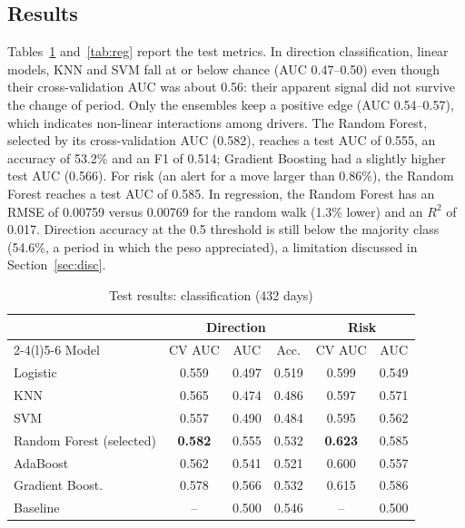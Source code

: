 \documentclass[conference]{IEEEtran}
\begin{document}
\subsection{Results}
Tables~\ref{tab:clf} and~\ref{tab:reg} report the test metrics. In direction classification, linear models, KNN and SVM fall at or below chance (AUC 0.47--0.50) even though their cross-validation AUC was about 0.56: their apparent signal did not survive the change of period. Only the ensembles keep a positive edge (AUC 0.54--0.57), which indicates non-linear interactions among drivers. The Random Forest, selected by its cross-validation AUC (0.582), reaches a test AUC of 0.555, an accuracy of 53.2\% and an F1 of 0.514; Gradient Boosting had a slightly higher test AUC (0.566). For risk (an alert for a move larger than 0.86\%), the Random Forest reaches a test AUC of 0.585. In regression, the Random Forest has an RMSE of 0.00759 versus 0.00769 for the random walk (1.3\% lower) and an $R^2$ of 0.017. Direction accuracy at the 0.5 threshold is still below the majority class (54.6\%, a period in which the peso appreciated), a limitation discussed in Section~\ref{sec:disc}.

\begin{table}[t]
\caption{Test results: classification (432 days)}
\label{tab:clf}
\centering
\footnotesize
\begin{tabular}{@{}lccccc@{}}
\toprule
 & \multicolumn{3}{c}{Direction} & \multicolumn{2}{c}{Risk} \\
\cmidrule(lr){2-4}\cmidrule(l){5-6}
Model & CV AUC & AUC & Acc. & CV AUC & AUC \\
\midrule
Logistic & 0.559 & 0.497 & 0.519 & 0.599 & 0.549 \\
KNN & 0.565 & 0.474 & 0.486 & 0.597 & 0.571 \\
SVM & 0.557 & 0.490 & 0.484 & 0.595 & 0.562 \\
Random Forest (selected) & \textbf{0.582} & 0.555 & 0.532 & \textbf{0.623} & 0.585 \\
AdaBoost & 0.562 & 0.541 & 0.521 & 0.600 & 0.557 \\
Gradient Boost. & 0.578 & 0.566 & 0.532 & 0.615 & 0.586 \\
\midrule
Baseline & -- & 0.500 & 0.546 & -- & 0.500 \\
\bottomrule
\end{tabular}
\end{table}
\end{document}
